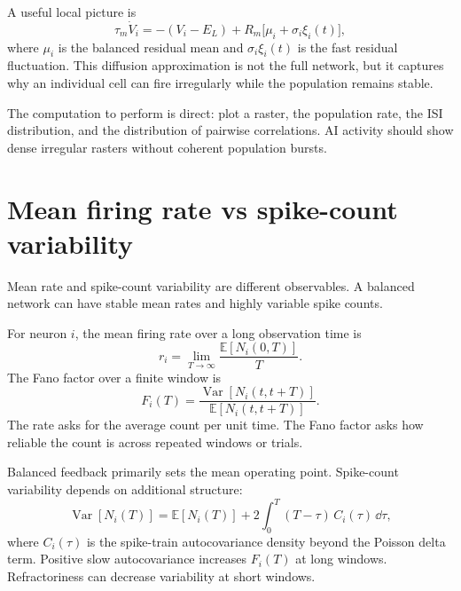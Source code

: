 A useful local picture is
%
\begin{equation}
  \tau_m\dot V_i
  =
  -(V_i-E_L)
  +
  R_m\bigl[\mu_i+\sigma_i\xi_i(t)\bigr],
  \label{eq:diffusion-ai-neuron}
\end{equation}
%
where $\mu_i$ is the balanced residual mean and $\sigma_i\xi_i(t)$ is the fast residual fluctuation. This diffusion approximation is not the full network, but it captures why an individual cell can fire irregularly while the population remains stable.

The computation to perform is direct: plot a raster, the population rate, the ISI distribution, and the distribution of pairwise correlations. AI activity should show dense irregular rasters without coherent population bursts.

\section{Mean firing rate vs spike-count variability}
\label{sec:mean-rate-vs-count-variability}

Mean rate and spike-count variability are different observables. A balanced network can have stable mean rates and highly variable spike counts.

For neuron $i$, the mean firing rate over a long observation time is
%
\begin{equation}
  r_i
  =
  \lim_{T\to\infty}\frac{\mathbb{E}[N_i(0,T)]}{T}.
  \label{eq:mean-rate-definition-ch04}
\end{equation}
%
The Fano factor over a finite window is
%
\begin{equation}
  F_i(T)
  =
  \frac{\operatorname{Var}[N_i(t,t+T)]}{\mathbb{E}[N_i(t,t+T)]}.
  \label{eq:fano-definition-ch04}
\end{equation}
%
The rate asks for the average count per unit time. The Fano factor asks how reliable the count is across repeated windows or trials.

Balanced feedback primarily sets the mean operating point. Spike-count variability depends on additional structure:
%
\begin{equation}
  \operatorname{Var}[N_i(T)]
  =
  \mathbb{E}[N_i(T)]
  +
  2\int_0^T (T-\tau)\,C_i(\tau)\,\dd\tau ,
  \label{eq:count-variance-autocov}
\end{equation}
%
where $C_i(\tau)$ is the spike-train autocovariance density beyond the Poisson delta term. Positive slow autocovariance increases $F_i(T)$ at long windows. Refractoriness can decrease variability at short windows.

